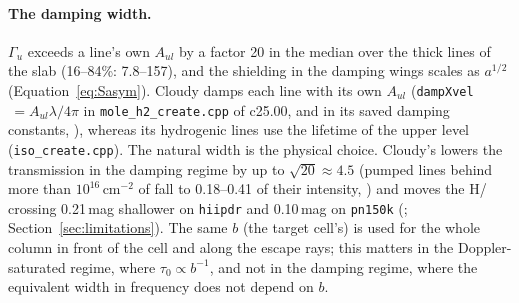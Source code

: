 \paragraph{The damping width.} $\Gamma_u$ exceeds a line's own $A_{ul}$ by a
factor 20 in the median over the thick lines of the  slab (16--84\%:
7.8--157), and the shielding in the damping wings scales as $a^{1/2}$
(Equation~\ref{eq:Sasym}). Cloudy damps each \Htwo{} line with its own $A_{ul}$
(\texttt{dampXvel}$\,=A_{ul}\lambda/4\pi$ in \texttt{mole\_h2\_create.cpp} of c25.00,
and in its saved damping constants, ), whereas its hydrogenic lines
use the lifetime of the upper level (\texttt{iso\_create.cpp}). The natural width
is the physical choice. Cloudy's lowers the transmission in the damping regime
by up to $\sqrt{20}\approx4.5$ (pumped lines behind more than $10^{16}$\,cm$^{-2}$ of
\Htwo{} fall to 0.18--0.41 of their intensity, ) and moves the
H/\Htwo{} crossing 0.21\,mag shallower on \texttt{hiipdr} and 0.10\,mag on
\texttt{pn150k} (; Section~\ref{sec:limitations}). The same $b$ (the target cell's) is used for the
whole column in front of the cell and along the escape rays; this matters in
the Doppler-saturated regime, where $\tau_0\propto b^{-1}$, and not in the damping
regime, where the equivalent width in frequency does not depend on $b$.

